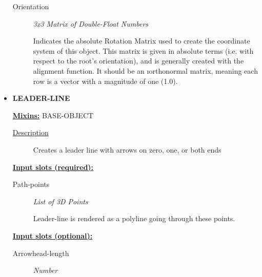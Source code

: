 \documentclass [11pt]{book}
\begin{document}
\begin{itemize}
\begin{description}
\item [Orientation]
\emph{3x3 Matrix of Double-Float Numbers}

 Indicates the absolute Rotation Matrix used to create
the coordinate system of this object. This matrix is given in absolute terms (i.e. with
respect to the root's orientation), and is generally created with the alignment function.
It should be an 
\i{orthonormal} matrix, meaning each row is a vector with a magnitude
of one (1.0).




\end{description}







\item {}
\label{prim:leader-line}
\textbf{LEADER-LINE}


\textbf{
\underline{Mixins:}} BASE-OBJECT





\begin{description}

\item [
\underline{Description}]


Creates a leader line with arrows on zero, one, or both ends



\end{description}








\textbf{
\underline{Input slots (required):}}

\begin{description}

\item [Path-points]
\emph{List of 3D Points}

 Leader-line is rendered as a polyline going through these points.




\end{description}






\textbf{
\underline{Input slots (optional):}}

\begin{description}

\item [Arrowhead-length]
\emph{Number}


\end{description}
\end{itemize}
\end{document}

